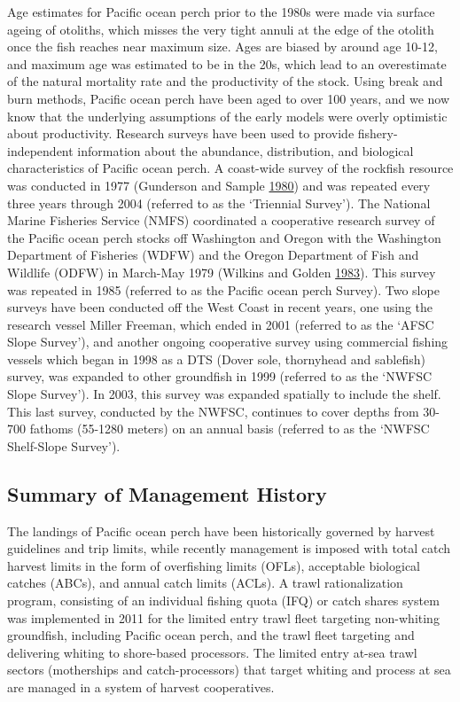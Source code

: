 \documentclass[12pt,]{article}
\begin{document}
Age estimates for Pacific ocean perch prior to the 1980s were made via
surface ageing of otoliths, which misses the very tight annuli at the
edge of the otolith once the fish reaches near maximum size. Ages are
biased by around age 10-12, and maximum age was estimated to be in the
20s, which lead to an overestimate of the natural mortality rate and the
productivity of the stock. Using break and burn methods, Pacific ocean
perch have been aged to over 100 years, and we now know that the
underlying assumptions of the early models were overly optimistic about
productivity. Research surveys have been used to provide
fishery-independent information about the abundance, distribution, and
biological characteristics of Pacific ocean perch. A coast-wide survey
of the rockfish resource was conducted in 1977 (Gunderson and Sample
\protect\hyperlink{ref-gunderson_distribution_1980}{1980}) and was
repeated every three years through 2004 (referred to as the `Triennial
Survey'). The National Marine Fisheries Service (NMFS) coordinated a
cooperative research survey of the Pacific ocean perch stocks off
Washington and Oregon with the Washington Department of Fisheries (WDFW)
and the Oregon Department of Fish and Wildlife (ODFW) in March-May 1979
(Wilkins and Golden
\protect\hyperlink{ref-wilkins_condition_1983}{1983}). This survey was
repeated in 1985 (referred to as the Pacific ocean perch Survey). Two
slope surveys have been conducted off the West Coast in recent years,
one using the research vessel Miller Freeman, which ended in 2001
(referred to as the `AFSC Slope Survey'), and another ongoing
cooperative survey using commercial fishing vessels which began in 1998
as a DTS (Dover sole, thornyhead and sablefish) survey, was expanded to
other groundfish in 1999 (referred to as the `NWFSC Slope Survey'). In
2003, this survey was expanded spatially to include the shelf. This last
survey, conducted by the NWFSC, continues to cover depths from 30-700
fathoms (55-1280 meters) on an annual basis (referred to as the `NWFSC
Shelf-Slope Survey').

\subsection{Summary of Management
History}\label{summary-of-management-history}

The landings of Pacific ocean perch have been historically governed by
harvest guidelines and trip limits, while recently management is imposed
with total catch harvest limits in the form of overfishing limits
(OFLs), acceptable biological catches (ABCs), and annual catch limits
(ACLs). A trawl rationalization program, consisting of an individual
fishing quota (IFQ) or catch shares system was implemented in 2011 for
the limited entry trawl fleet targeting non-whiting groundfish,
including Pacific ocean perch, and the trawl fleet targeting and
delivering whiting to shore-based processors. The limited entry at-sea
trawl sectors (motherships and catch-processors) that target whiting and
process at sea are managed in a system of harvest cooperatives.
\end{document}
